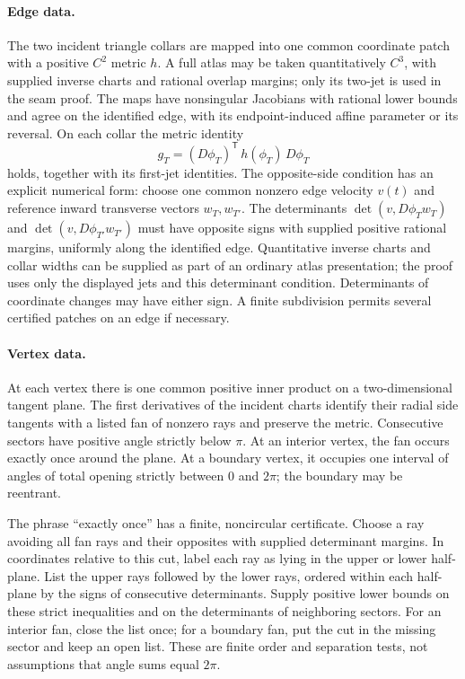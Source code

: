 \paragraph{Edge data.}
The two incident triangle collars are mapped into one common coordinate patch with a positive $C^2$ metric $h$. A full atlas may be taken quantitatively $C^3$, with supplied inverse charts and rational overlap margins; only its two-jet is used in the seam proof. The maps have nonsingular Jacobians with rational lower bounds and agree on the identified edge, with its endpoint-induced affine parameter or its reversal. On each collar the metric identity
\[
g_T=(D\phi_T)^{\mathsf T}\,h(\phi_T)\,D\phi_T
\]
holds, together with its first-jet identities. The opposite-side condition has an explicit numerical form: choose one common nonzero edge velocity $v(t)$ and reference inward transverse vectors $w_T,w_{T'}$. The determinants $\det(v,D\phi_Tw_T)$ and $\det(v,D\phi_{T'}w_{T'})$ must have opposite signs with supplied positive rational margins, uniformly along the identified edge. Quantitative inverse charts and collar widths can be supplied as part of an ordinary atlas presentation; the proof uses only the displayed jets and this determinant condition. Determinants of coordinate changes may have either sign. A finite subdivision permits several certified patches on an edge if necessary.

\paragraph{Vertex data.}
At each vertex there is one common positive inner product on a two-dimensional tangent plane. The first derivatives of the incident charts identify their radial side tangents with a listed fan of nonzero rays and preserve the metric. Consecutive sectors have positive angle strictly below $\pi$. At an interior vertex, the fan occurs exactly once around the plane. At a boundary vertex, it occupies one interval of angles of total opening strictly between $0$ and $2\pi$; the boundary may be reentrant.

The phrase ``exactly once'' has a finite, noncircular certificate. Choose a ray avoiding all fan rays and their opposites with supplied determinant margins. In coordinates relative to this cut, label each ray as lying in the upper or lower half-plane. List the upper rays followed by the lower rays, ordered within each half-plane by the signs of consecutive determinants. Supply positive lower bounds on these strict inequalities and on the determinants of neighboring sectors. For an interior fan, close the list once; for a boundary fan, put the cut in the missing sector and keep an open list. These are finite order and separation tests, not assumptions that angle sums equal $2\pi$.

